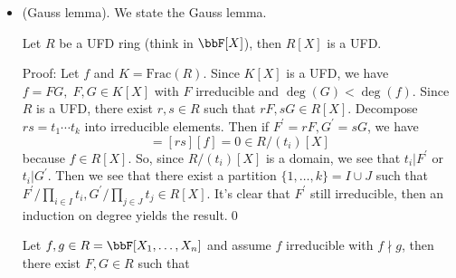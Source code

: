 \begin{itemize}
\begin{example}
    Now, since $\det$ is an irreducible homogeneous polynomial, the difference $\det-1$ must be irreducible. Therefore
    $I(SL_n\bbF) = (\det - 1)$ and we can compute the tangent space $T_I(SL_n)=V(d_I(\det))$. 
    We have 
    \begin{equation}
        \begin{split}
            d_I\det &= \sum_{k,\ell} D_{k\ell}(\det)(I)X_{k\ell}\\
                &= \sum_{k,\ell}\sum_{\sigma\in S_n}D_{k\ell}\prod_{i=1}^nX_{i\sigma(i)}(I) X_{k\ell}\\
                &= \sum_{k,\ell}\sum_{\sigma\in S_n}\delta_{\ell,\sigma(k)}
                \prod_{i\neq k}\delta_{i,\sigma(i)} X_{k\ell}\\
                &= \sum_{k,\ell}\delta_{k\ell} X_{k\ell}\quad
                (\delta_{\ell,\sigma(k)}
                \prod_{i\neq k}\delta_{i,\sigma(i)}\neq0\;\text{only if }\sigma=1)\\
                &=\sum_k X_{kk}.
        \end{split}
    \end{equation}
    Therefore $T_ISL_n(\bbF) = \fr{sl}_n\bbF$, the Lie algebra of traceless matrices.
  \end{example}
  \item(Gauss lemma).
  We state the Gauss lemma.
  \begin{lemma}
    Let $R$ be a UFD ring (think in $\bbF[X]$), then $R[X]$ is a UFD.
  \end{lemma} 
  Proof: Let $f$ and $K=\text{Frac}(R)$. Since $K[X]$ is a UFD, we have 
  $f = FG,\;F,G\in K[X]$ with $F$ irreducible and $\deg(G)<\deg(f)$. Since $R$ is a UFD, there exist 
  $r,s\in R$ such that $rF,sG\in R[X]$. Decompose $rs = t_1\cdots t_k$ into irreducible elements. 
  Then if $F^\prime=rF, G^\prime=sG$, we have 
  \begin{equation}
    [F^\prime][G^\prime] = [rs][f] = 0 \in R/(t_i)[X]
  \end{equation}
  because $f\in R[X]$. So, since $R/(t_i)[X]$ is a domain, we see that $t_i|F^\prime$ or $t_i|G^\prime$. Then we see that 
  there exist a partition $\{1,\dots, k\}=I\cup J$ such that $F^\prime/\prod_{i\in I}t_i, G^\prime/\prod_{j\in J}t_j\in R[X]$.
  It's clear that $F^\prime$ still irreducible, then an induction on degree yields the result.\qed
  \begin{corollary}\label{corollary: generalized gcd}
    Let $f,g\in R=\bbF[X_1,\dots, X_n]$ and assume $f$ irreducible with $f\nmid g$, then there exist $F,G\in R$ such that 

\end{corollary}
\end{itemize}
